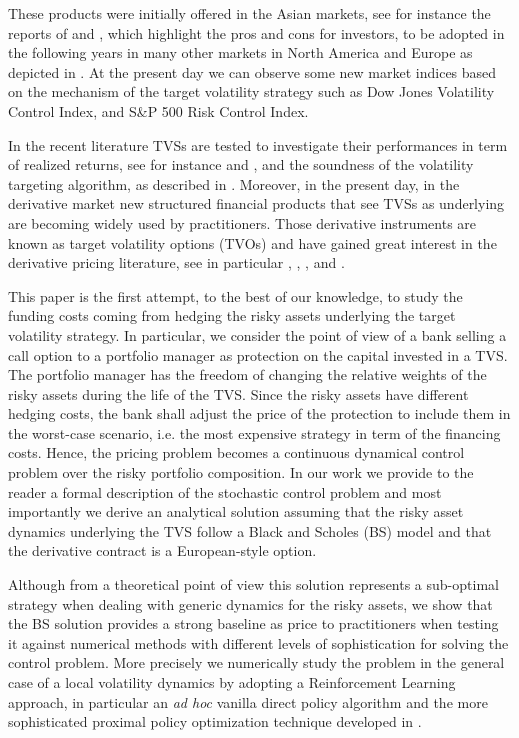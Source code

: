 \documentclass[11pt]{article}
\begin{document}
These products were initially offered in the Asian markets, see for instance the reports of \textcite{Chew2011} and \textcite{Xue2012}, which highlight the pros and cons for investors, to be adopted in the following years in many other markets in North America and Europe as depicted in \textcite{Morrison2013}. At the present day we can observe some new market indices based on the mechanism of the target volatility strategy such as Dow Jones Volatility Control Index, and S\&P 500 Risk Control Index.

In the recent literature TVSs are tested to investigate their performances in term of realized returns, see for instance \textcite{Hocquard2013} and \textcite{Perchet2016}, and the soundness of the volatility targeting algorithm, as described in \textcite{Kim2018}. Moreover, in the present day, in the derivative market new structured financial products that see TVSs as underlying are becoming widely used by practitioners. Those derivative instruments are known as target volatility options (TVOs) and have gained great interest in the derivative pricing literature, see in particular  \textcite{DiGraziano2012}, \textcite{Grasselli2016}, \textcite{Albeverio2019}, and \textcite{DiPersio2019}. 

This paper is the first attempt, to the best of our knowledge, to study the funding costs coming from hedging the risky assets underlying the target volatility strategy. In particular, we consider the point of view of a bank selling a call option to a portfolio manager as protection on the capital invested in a TVS. The portfolio manager has the freedom of changing the relative weights of the risky assets during the life of the TVS. Since the risky assets have different hedging costs, the bank shall adjust the price of the protection to include them in the worst-case scenario, i.e. the most expensive strategy in term of the financing costs. Hence, the pricing problem becomes a continuous dynamical control problem over the risky portfolio composition. In our work we provide to the reader a formal description of the stochastic control problem and most importantly we derive an analytical solution assuming that the risky asset dynamics underlying the TVS  follow a Black and Scholes (BS) model \citep{BlackScholes1973} and that the derivative contract is a European-style option. 

Although from a theoretical point of view this solution represents a sub-optimal strategy when dealing with generic dynamics for the risky assets, we show that the BS solution provides a strong baseline as price to practitioners when testing it against numerical methods with different levels of sophistication for solving the control problem. More precisely we numerically study the problem in the general case of a local volatility dynamics \citep{Dupire1994,Derman1994}  by adopting a Reinforcement Learning approach, in particular an \textit{ad hoc} vanilla direct policy algorithm and the more sophisticated proximal policy optimization technique developed in \textcite{Schulman2017}. 
\\
\end{document}
